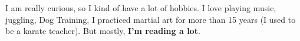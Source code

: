 

\begin{cvparagraph}

I am really curious, so I kind of have a lot of hobbies.
I love playing music, juggling, Dog Training, I practiced martial art for more than 15 years (I used to be a karate teacher).
But mostly, \textbf{I'm reading a lot}.

\end{cvparagraph}
